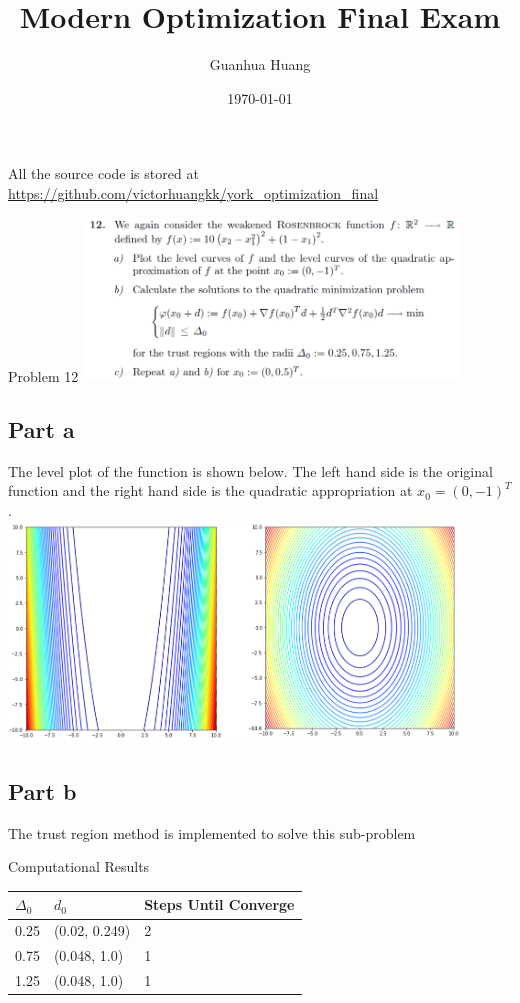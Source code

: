 \documentclass[12pt]{article}
\title{Modern Optimization Final Exam}
\author{Guanhua Huang}
\date\today
\begin{document}
\maketitle %
All the source code is stored at \url{https://github.com/victorhuangkk/york_optimization_final}

\begin{section}{Problem 12}
\includegraphics[width=10cm]{img/problem12.png}

\subsection{Part a}
The level plot of the function is shown below. The left hand side is the original function and the right hand side is the quadratic appropriation at $x_0 = (0, -1)^T$. \\

\includegraphics[width=12cm]{img/problem12_plt1.png}


\subsection{Part b}
The trust region method is implemented to solve this sub-problem


Computational Results 


\begin{tabular}{lll}
	\hline
	$\Delta_0$ & $d_0$ & Steps Until Converge \\
	\hline\hline
	0.25 & (0.02, 0.249) & 2 \\
	0.75 & (0.048, 1.0)  & 1 \\
	1.25 & (0.048, 1.0)  & 1
\end{tabular}


\end{section}
\end{document}
